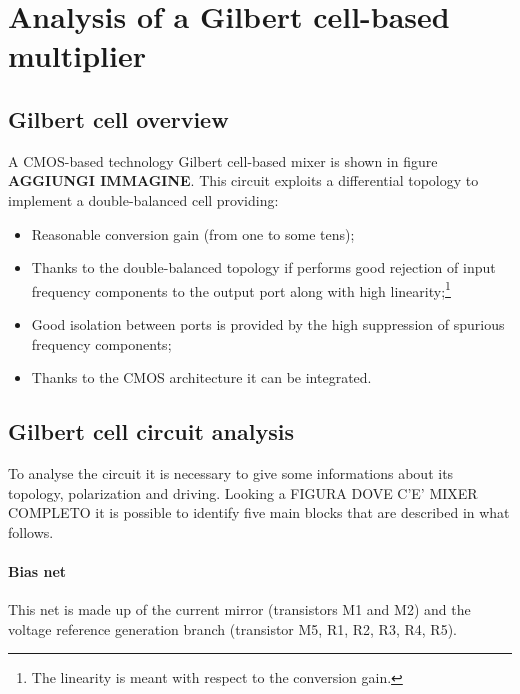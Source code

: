 \section{Analysis of a Gilbert cell-based multiplier }

\subsection{Gilbert cell overview}
A CMOS-based technology Gilbert cell-based mixer is shown in figure \textbf{AGGIUNGI IMMAGINE}. This circuit exploits a differential topology to implement a double-balanced cell providing:
\begin{itemize}
	\item Reasonable conversion gain (from one to some tens);
	\item Thanks to the double-balanced topology if performs good rejection of input frequency components to the output port along with high linearity;\footnote{The linearity is meant with respect to the conversion gain.}
	\item Good isolation between ports is provided by the high suppression of spurious frequency components;
	\item Thanks to the CMOS architecture it can be integrated.
\end{itemize}
\subsection{Gilbert cell circuit analysis}
To analyse the circuit it is necessary to give some informations about its topology, polarization and driving. Looking a FIGURA DOVE C'E' MIXER COMPLETO it is possible to identify five main blocks that are described in what follows.
\paragraph{Bias net}

This net is made up of the current mirror (transistors M1 and M2) and the voltage reference generation branch (transistor M5, R1, R2, R3, R4, R5). 

